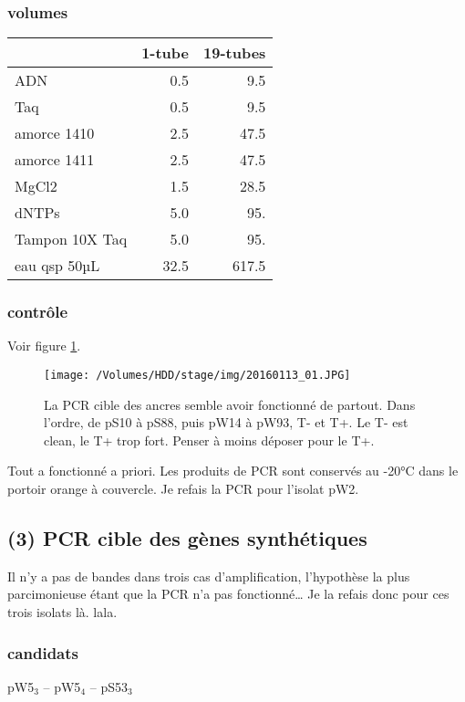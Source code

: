 \documentclass[9pt, oneside, twocolumn]{scrartcl}
\begin{document}
\subsubsection{volumes}
\label{sec:orgheadline21}
\begin{center}
\begin{tabular}{lrr}
\toprule
 & 1-tube & 19-tubes\\
\midrule
ADN & 0.5 & 9.5\\
Taq & 0.5 & 9.5\\
amorce 1410 & 2.5 & 47.5\\
amorce 1411 & 2.5 & 47.5\\
MgCl2 & 1.5 & 28.5\\
dNTPs & 5.0 & 95.\\
Tampon 10X Taq & 5.0 & 95.\\
\midrule
eau qsp 50µL & 32.5 & 617.5\\
\bottomrule
\end{tabular}
\end{center}

\subsubsection{contrôle}
\label{sec:orgheadline22}
Voir figure \ref{fig:orgparagraph2}. 

\begin{figure}[htb]
\centering
\texttt{[image: /Volumes/HDD/stage/img/20160113\_01.JPG]}
\caption{\label{fig:orgparagraph2}
La PCR cible des ancres semble avoir fonctionné de partout. Dans l'ordre, de pS10 à pS88, puis pW14 à pW93, T- et T+. Le T- est clean, le T+ trop fort. Penser à moins déposer pour le T+.}
\end{figure}

Tout a fonctionné a priori. Les produits de PCR sont conservés au -20°C dans le
portoir orange à couvercle. Je refais la PCR pour l'isolat pW2.

\subsection{(3) PCR cible des gènes synthétiques}
\label{sec:orgheadline28}
Il n'y a pas de bandes dans trois cas d'amplification, l'hypothèse la plus
parcimonieuse étant que la PCR n'a pas fonctionné… Je la refais donc pour ces
trois isolats là. lala. 

\subsubsection{candidats}
\label{sec:orgheadline24}
pW5\(_{\text{3}}\) -- pW5\(_{\text{4}}\) -- pS53\(_{\text{3}}\) 
\end{document}
